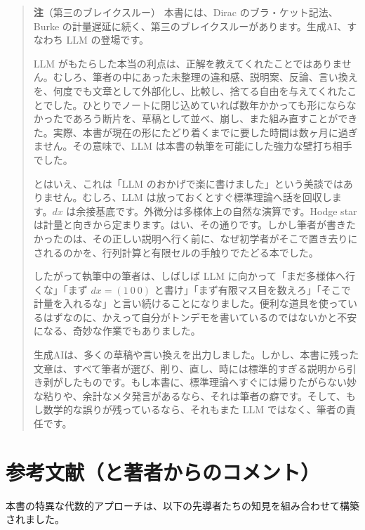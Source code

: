 \documentclass[a4paper,12pt,openany]{book}
\begin{document}
\begin{quote}
\textbf{注}（第三のブレイクスルー） 本書には、Dirac
のブラ・ケット記法、Burke
の計量遅延に続く、第三のブレイクスルーがあります。生成AI、すなわち LLM
の登場です。

LLM
がもたらした本当の利点は、正解を教えてくれたことではありません。むしろ、筆者の中にあった未整理の違和感、説明案、反論、言い換えを、何度でも文章として外部化し、比較し、捨てる自由を与えてくれたことでした。ひとりでノートに閉じ込めていれば数年かかっても形にならなかったであろう断片を、草稿として並べ、崩し、また組み直すことができた。実際、本書が現在の形にたどり着くまでに要した時間は数ヶ月に過ぎません。その意味で、LLM
は本書の執筆を可能にした強力な壁打ち相手でした。

とはいえ、これは「LLM
のおかげで楽に書けました」という美談ではありません。むしろ、LLM
は放っておくとすぐ標準理論へ話を回収します。\(dx\)
は余接基底です。外微分は多様体上の自然な演算です。Hodge star
は計量と向きから定まります。はい、その通りです。しかし筆者が書きたかったのは、その正しい説明へ行く前に、なぜ初学者がそこで置き去りにされるのかを、行列計算と有限セルの手触りでたどる本でした。

したがって執筆中の筆者は、しばしば LLM
に向かって「まだ多様体へ行くな」「まず \(dx=(1\ 0\ 0)\)
と書け」「まず有限マス目を数えろ」「そこで計量を入れるな」と言い続けることになりました。便利な道具を使っているはずなのに、かえって自分がトンデモを書いているのではないかと不安になる、奇妙な作業でもありました。

生成AIは、多くの草稿や言い換えを出力しました。しかし、本書に残った文章は、すべて筆者が選び、削り、直し、時には標準的すぎる説明から引き剥がしたものです。もし本書に、標準理論へすぐには帰りたがらない妙な粘りや、余計なメタ発言があるなら、それは筆者の癖です。そして、もし数学的な誤りが残っているなら、それもまた
LLM ではなく、筆者の責任です。
\end{quote}

\newpage

\hypertarget{ux53c2ux8003ux6587ux732eux3068ux8457ux8005ux304bux3089ux306eux30b3ux30e1ux30f3ux30c8}{%
\chapter{参考文献（と著者からのコメント）}\label{ux53c2ux8003ux6587ux732eux3068ux8457ux8005ux304bux3089ux306eux30b3ux30e1ux30f3ux30c8}}

本書の特異な代数的アプローチは、以下の先導者たちの知見を組み合わせて構築されました。

\par\vspace{0.35em}\par
\end{document}
